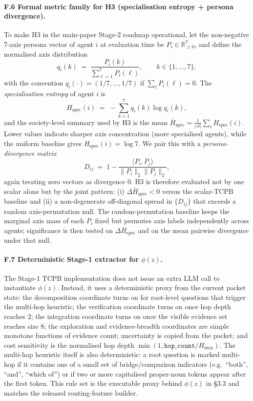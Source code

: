 \paragraph{F.6 Formal metric family for H3 (specialisation entropy + persona divergence).}
To make H3 in the main-paper Stage-2 roadmap operational, let the non-negative 7-axis persona vector of agent $i$ at evaluation time be $P_i\in\mathbb{R}_{\ge 0}^{7}$, and define the normalised axis distribution
\[
q_i(k)\;=\;\frac{P_i(k)}{\sum_{\ell=1}^{7}P_i(\ell)},\qquad k\in\{1,\ldots,7\},
\]
with the convention $q_i(\cdot){=}(1/7,\ldots,1/7)$ if $\sum_{\ell}P_i(\ell){=}0$. The \emph{specialisation entropy} of agent $i$ is
\[
H_{\mathrm{spec}}(i)\;=\;-\sum_{k=1}^{7} q_i(k)\log q_i(k),
\]
and the society-level summary used by H3 is the mean $\bar H_{\mathrm{spec}}{=}\frac{1}{|\mathcal{A}|}\sum_i H_{\mathrm{spec}}(i)$. Lower values indicate sharper axis concentration (more specialised agents), while the uniform baseline gives $H_{\mathrm{spec}}(i){=}\log 7$. We pair this with a \emph{persona-divergence matrix}
\[
D_{ij}\;=\;1-\frac{\langle P_i,P_j\rangle}{\|P_i\|_2\|P_j\|_2},
\]
again treating zero vectors as divergence $0$. H3 is therefore evaluated not by one scalar alone but by the joint pattern: (i) $\Delta \bar H_{\mathrm{spec}}<0$ versus the scalar-TCPB baseline and (ii) a non-degenerate off-diagonal spread in $\{D_{ij}\}$ that exceeds a random axis-permutation null. The random-permutation baseline keeps the marginal axis mass of each $P_i$ fixed but permutes axis labels independently across agents; significance is then tested on $\Delta \bar H_{\mathrm{spec}}$ and on the mean pairwise divergence under that null.

\paragraph{F.7 Deterministic Stage-1 extractor for $\phi(z)$.}
The Stage-1 TCPB implementation does not issue an extra LLM call to instantiate $\phi(z)$. Instead, it uses a deterministic proxy from the current packet state: the decomposition coordinate turns on for root-level questions that trigger the multi-hop heuristic; the verification coordinate turns on once hop depth reaches $2$; the integration coordinate turns on once the visible evidence set reaches size $8$; the exploration and evidence-breadth coordinates are simple monotone functions of evidence count; uncertainty is copied from the packet; and cost sensitivity is the normalised hop depth $\min(1,\texttt{hop\_count}/H_{\max})$. The multi-hop heuristic itself is also deterministic: a root question is marked multi-hop if it contains one of a small set of bridge/comparison indicators (e.g.\ ``both'', ``and'', ``which of'') or if two or more capitalised proper-noun tokens appear after the first token. This rule set is the executable proxy behind $\phi(z)$ in \S 3.3 and matches the released routing-feature builder.
